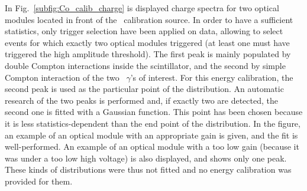 In Fig.~\ref{subfig:Co_calib_charge} is displayed charge spectra for two optical modules located in front of the \Co\ calibration source.
In order to have a sufficient statistics, only trigger selection have been applied on data, allowing to select events for which exactly two optical modules triggered (at least one must have triggered the high amplitude threshold).
The first peak is mainly populated by double Compton interactions inside the scintillator, and the second by simple Compton interaction of the two \Co\ $\gamma$'s of interest.
For this energy calibration, the second peak is used as the particular point of the distribution.
An automatic research of the two peaks is performed and, if exactly two are detected, the second one is fitted with a Gaussian function.
This point has been chosen because it is less statistics-dependent than the end point of the distribution.
In the figure, an example of an optical module with an appropriate gain is given, and the fit is well-performed.
An example of an optical module with a too low gain (because it was under a too low high voltage) is also displayed, and shows only one peak.
These kinds of distributions were thus not fitted and no energy calibration was provided for them.
